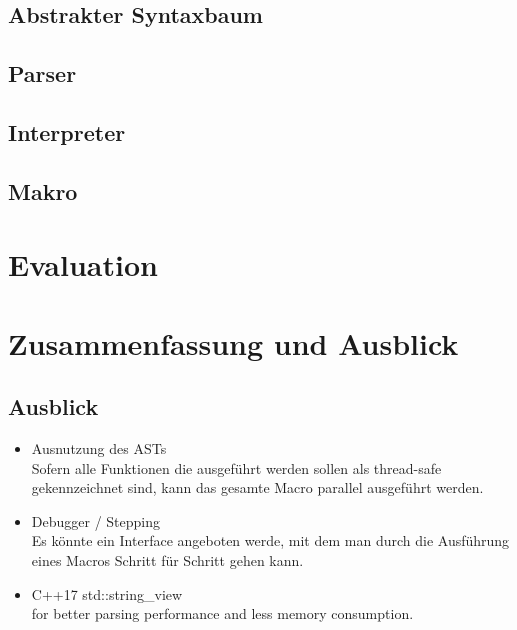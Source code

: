   \subsection{Abstrakter Syntaxbaum}
  \label{ssec:Abstrakter Syntaxbaum}

  \subsection{Parser}
  \label{ssec:Parser}

  \subsection{Interpreter}
  \label{ssec:Interpreter}

  \subsection{Makro}
  \label{ssec:Makro}

\section{Evaluation}
\label{sec:Evaluation}

\section{Zusammenfassung und Ausblick}
\label{sec:Zusammenfassung und Ausblick}

  \subsection{Ausblick}
  \label{sec:Ausblick}
    \begin{itemize}
      \item Ausnutzung des ASTs\\
        Sofern alle Funktionen die ausgeführt werden sollen als thread-safe gekennzeichnet sind, kann das gesamte Macro parallel ausgeführt werden.
      \item Debugger / Stepping\\
        Es könnte ein Interface angeboten werde, mit dem man durch die Ausführung eines Macros Schritt für Schritt gehen kann.
      \item C++17 std::string\_view\\
        for better parsing performance and less memory consumption.
    \end{itemize}


